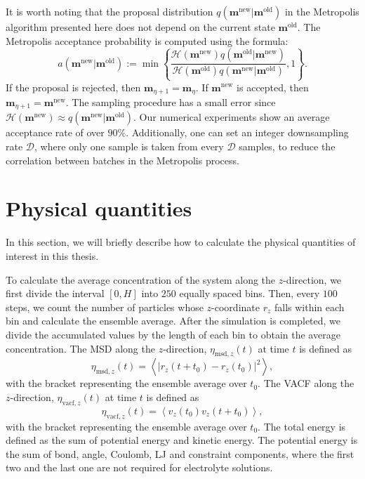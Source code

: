 It is worth noting that the proposal distribution $q(\bm{m}^{\text{new}}|\bm{m}^{\text{old}})$ in the Metropolis algorithm presented here does not depend on the current state $\bm{m}^{\text{old}}$. The Metropolis acceptance probability is computed using the formula:
\begin{equation}
	a(\bm{m}^{\text{new}}|\bm{m}^{\text{old}}):=\min\left\{\frac{\mathcal{H}(\bm{m}^{\text{new}})q(\bm{m}^{\text{old}}|\bm{m}^{\text{new}})}{\mathcal{H}(\bm{m}^{\text{old}})q(\bm{m}^{\text{new}}|\bm{m}^{\text{old}})},1\right\}.
\end{equation}
If the proposal is rejected, then $\bm{m}_{\eta+1}=\bm{m}_{\eta}$. If $\bm{m}^{\text{new}}$ is accepted, then $\bm{m}_{\eta+1}=\bm{m}^{\text{new}}$. The sampling procedure has a small error since $\mathcal{H}(\bm{m}^{\text{new}})\approx q(\bm{m}^{\text{new}}|\bm{m}^{\text{old}})$. Our numerical experiments show an average acceptance rate of over $90\%$. Additionally, one can set an integer downsampling rate $\mathscr{D}$, where only one sample is taken from every $\mathscr{D}$ samples, to reduce the correlation between batches in the Metropolis process.

\section{Physical quantities}\label{Sec::phyquan}

In this section, we will briefly describe how to calculate the physical quantities of interest in this thesis.

To calculate the average concentration of the system along the $z$-direction, we first divide the interval $[0,H]$ into $250$ equally spaced bins. Then, every $100$ steps, we count the number of particles whose $z$-coordinate $r_z$ falls within each bin and calculate the ensemble average. After the simulation is completed, we divide the accumulated values by the length of each bin to obtain the average concentration. The MSD along the $z$-direction, $\eta_{\text{msd},z}(t)$ at time $t$ is defined as
\begin{equation}
\eta_{\mathrm{msd},z}(t)=\left\langle\left|r_z\left(t+t_0\right)-r_z\left(t_0\right)\right|^2\right\rangle,
\end{equation}
with the bracket representing the ensemble average over $t_0$. The VACF along the $z$-direction, $\eta_{\text{vacf},z}(t)$ at time $t$ is defined as
\begin{equation}
\eta_{\text {vacf},z}(t)=\left\langle v_z\left(t_0\right) v_z(t+t_0)\right\rangle,
\end{equation}
with the bracket representing the ensemble average over $t_0$. The total energy is defined as the sum of potential energy and kinetic energy. The potential energy is the sum of bond, angle, Coulomb, LJ and  {constraint} components, where the first two and the last one are not required for electrolyte solutions. 

